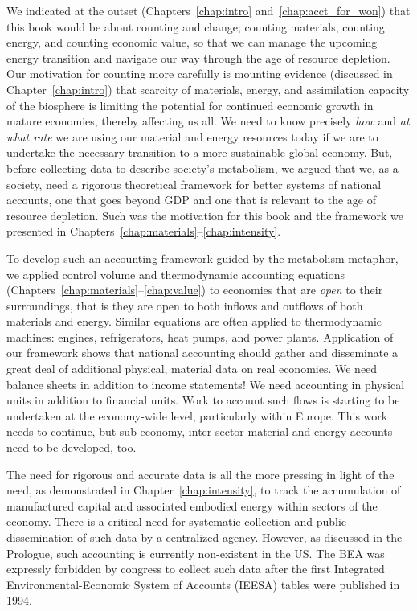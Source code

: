 We indicated at the outset (Chapters~\ref{chap:intro} and~\ref{chap:acct_for_won})
that this book would be about counting and change;
counting materials, counting energy, and counting economic value,
so that we can manage the upcoming energy transition
and navigate our way through the age of resource depletion.
Our motivation for counting more carefully
is mounting evidence (discussed in Chapter~\ref{chap:intro}) that 
scarcity of materials, energy, and 
assimilation capacity of the biosphere is limiting the potential
for continued economic growth in mature economies, 
thereby affecting us all.
We need to know precisely \emph{how} and \emph{at what rate} 
we are using our material and energy resources today
if we are to undertake the necessary transition to 
a more sustainable global economy.
But, before collecting data to describe society's metabolism,
we argued that we, as a society, 
need a rigorous theoretical framework for better systems of national accounts, 
one that goes beyond GDP and one that is relevant to the age of resource depletion.
Such was the motivation for this book and the framework we presented
in Chapters~\ref{chap:materials}--\ref{chap:intensity}.

To develop such an accounting framework 
guided by the metabolism metaphor,
we applied control volume and thermodynamic accounting equations 
(Chapters~\ref{chap:materials}--\ref{chap:value})
to economies that are \emph{open} to their surroundings,
that is they are open to both inflows and outflows of both
materials and energy.
Similar equations are often applied to thermodynamic machines:
engines, refrigerators, heat pumps, and power plants.
Application of our framework shows that 
national accounting should gather and disseminate
a great deal of additional physical, material data on real economies.
We need balance sheets in addition to income statements!
We need accounting in physical units in addition to financial units.
Work to account such flows is starting to be
undertaken at the economy-wide level,
particularly within Europe.\cite{EUROSTAT2011}
This work needs to continue, 
but sub-economy, inter-sector material and energy 
accounts need to be developed, too.

The need for rigorous and accurate data
is all the more pressing in light of the need,
as demonstrated in Chapter~\ref{chap:intensity}, 
to track the accumulation 
of manufactured capital and associated embodied energy
within sectors of the economy.
There is a critical need for systematic
collection and public dissemination of such data 
by a centralized agency.
However,
as discussed in the Prologue, 
such accounting is currently non-existent in the US.
The BEA was expressly forbidden by congress 
to collect such data
after the first
Integrated Environmental-Economic System of Accounts (IEESA)
tables were published in 1994.

